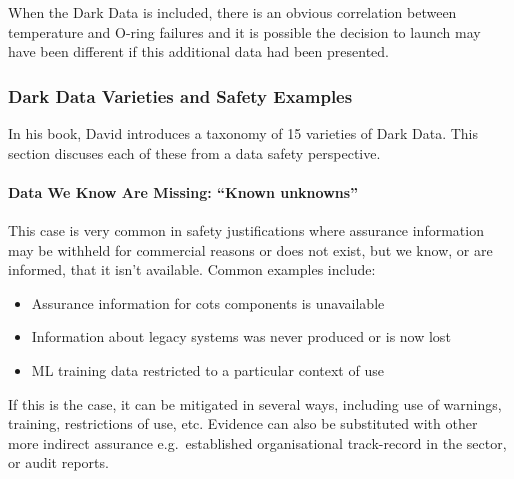 When the Dark Data is included, there is an obvious correlation between temperature and O-ring failures and it is possible the decision to launch may have been different if this additional data had been presented.

\subsubsection{Dark Data Varieties and Safety Examples}
In his book, David introduces a taxonomy of 15 varieties of Dark Data. This section discuses each of these from a data safety perspective.

\paragraph{Data We Know Are Missing: ``Known unknowns''}\label{bkm:dark1}

This case is very common in safety justifications where assurance information may be withheld for commercial reasons or does not exist, but we know, or are informed, that it isn’t available. Common examples include:
\begin{itemize}
  \item Assurance information for \gls{cots} components is unavailable
  \item Information about legacy systems was never produced or is now lost
  \item ML training data restricted to a particular context of use
\end{itemize}
    If this is the case, it can be mitigated in several ways, including use of warnings, training, restrictions of use, etc. Evidence can also be substituted with other more indirect assurance e.g.\ established organisational track-record in the sector, or audit reports.
    
